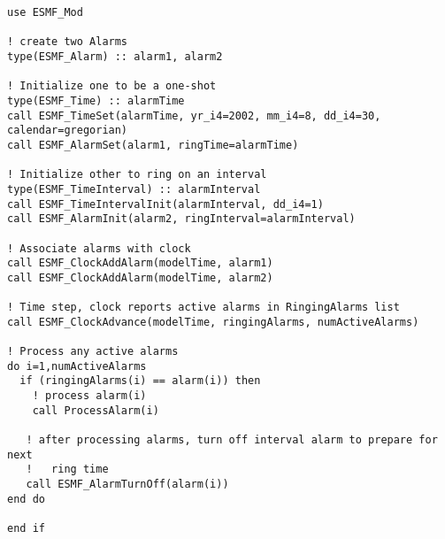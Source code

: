 
\begin{verbatim}
use ESMF_Mod

! create two Alarms
type(ESMF_Alarm) :: alarm1, alarm2

! Initialize one to be a one-shot
type(ESMF_Time) :: alarmTime
call ESMF_TimeSet(alarmTime, yr_i4=2002, mm_i4=8, dd_i4=30, calendar=gregorian)
call ESMF_AlarmSet(alarm1, ringTime=alarmTime)

! Initialize other to ring on an interval
type(ESMF_TimeInterval) :: alarmInterval
call ESMF_TimeIntervalInit(alarmInterval, dd_i4=1)
call ESMF_AlarmInit(alarm2, ringInterval=alarmInterval)

! Associate alarms with clock
call ESMF_ClockAddAlarm(modelTime, alarm1)
call ESMF_ClockAddAlarm(modelTime, alarm2)

! Time step, clock reports active alarms in RingingAlarms list
call ESMF_ClockAdvance(modelTime, ringingAlarms, numActiveAlarms)

! Process any active alarms
do i=1,numActiveAlarms
  if (ringingAlarms(i) == alarm(i)) then
    ! process alarm(i)
    call ProcessAlarm(i)

   ! after processing alarms, turn off interval alarm to prepare for next
   !   ring time
   call ESMF_AlarmTurnOff(alarm(i))
end do

end if
\end{verbatim}
